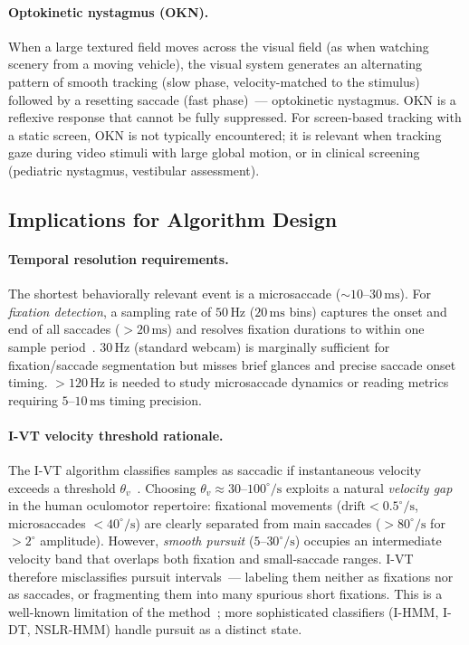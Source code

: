 \documentclass[11pt,a4paper]{article}
\begin{document}
\paragraph{Optokinetic nystagmus (OKN).}
When a large textured field moves across the visual field (as when watching scenery from a moving vehicle), the visual system generates an alternating pattern of smooth tracking (slow phase, velocity-matched to the stimulus) followed by a resetting saccade (fast phase)~--- optokinetic nystagmus.
OKN is a reflexive response that cannot be fully suppressed.
For screen-based tracking with a static screen, OKN is not typically encountered; it is relevant when tracking gaze during video stimuli with large global motion, or in clinical screening (pediatric nystagmus, vestibular assessment).

\subsection{Implications for Algorithm Design}
\label{sec:physio_implications}

\paragraph{Temporal resolution requirements.}
The shortest behaviorally relevant event is a microsaccade (${\sim}10$--$30\,\text{ms}$).
For \textit{fixation detection}, a sampling rate of $50\,\text{Hz}$ ($20\,\text{ms}$ bins) captures the onset and end of all saccades ($>20\,\text{ms}$) and resolves fixation durations to within one sample period~\cite{salvucci2000identifying}.
$30\,\text{Hz}$ (standard webcam) is marginally sufficient for fixation/saccade segmentation but misses brief glances and precise saccade onset timing.
$>120\,\text{Hz}$ is needed to study microsaccade dynamics or reading metrics requiring $5$--$10\,\text{ms}$ timing precision.

\paragraph{I-VT velocity threshold rationale.}
\label{sec:ivt_pursuit}
The I-VT algorithm classifies samples as saccadic if instantaneous velocity exceeds a threshold $\theta_v$~\cite{salvucci2000identifying}.
Choosing $\theta_v \approx 30$--$100^\circ/\text{s}$ exploits a natural \emph{velocity gap} in the human oculomotor repertoire:
fixational movements ($\text{drift} < 0.5^\circ/\text{s}$, microsaccades $<40^\circ/\text{s}$) are clearly separated from main saccades ($>80^\circ/\text{s}$ for $>2^\circ$ amplitude).
However, \textit{smooth pursuit} ($5$--$30^\circ/\text{s}$) occupies an intermediate velocity band that overlaps both fixation and small-saccade ranges.
I-VT therefore misclassifies pursuit intervals~--- labeling them neither as fixations nor as saccades, or fragmenting them into many spurious short fixations.
This is a well-known limitation of the method~\cite{startsev2017one}; more sophisticated classifiers (I-HMM, I-DT, NSLR-HMM) handle pursuit as a distinct state.
\end{document}
